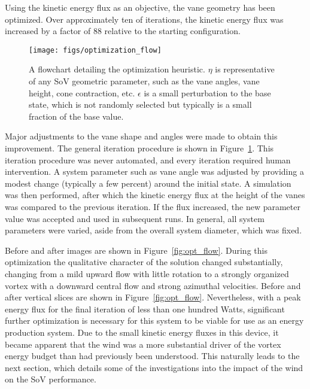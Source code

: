 Using the kinetic energy flux as an objective, the vane geometry has
been optimized. Over approximately ten of iterations, the
kinetic energy flux was increased by a factor of 88 relative to the 
starting configuration. 

\begin{figure}[htb]
 \centering
 \texttt{[image: figs/optimization\_flow]}
 \caption{A flowchart detailing the optimization heuristic. $\eta$ is
 representative of any SoV geometric parameter, such as the vane angles,
 vane height, cone contraction, etc. $\epsilon$ is a small perturbation
 to the base state, which is not randomly selected but typically is a
 small fraction of the base value. }
 \label{fig:opt_image}
\end{figure}


Major adjustments to the vane shape and angles were made
to obtain this improvement. The general iteration procedure is shown in
Figure~\ref{fig:opt_image}. This iteration procedure was never
automated, and every iteration required human intervention. A system 
parameter such as vane angle was adjusted by providing a modest change
(typically a few percent) around the initial state. A simulation was
then performed, after which the kinetic energy flux at the height of the
vanes was compared to the previous iteration. If the flux increased,
the new parameter value was accepted and used in subsequent runs. In
general, all system parameters were varied, aside from the overall
system diameter, which was fixed. 



Before and after images are shown in
Figure~\ref{fig:opt_flow}. During this optimization 
the qualitative character of the solution changed substantially,
changing from a mild upward flow with little rotation to a strongly
organized vortex with a downward central flow and strong azimuthal 
velocities. Before and after vertical slices are shown in
Figure~\ref{fig:opt_flow}. Nevertheless, with a peak energy flux for the
final iteration of less than one hundred Watts, significant further 
optimization is necessary for this system to be viable for use as an 
energy production system. Due to the small kinetic energy fluxes in
this device, it became apparent that the wind was a more substantial
driver of the vortex energy budget than had previously been understood. 
This naturally leads to the next section, which details some of the
investigations into the impact of the wind on the SoV performance. 

